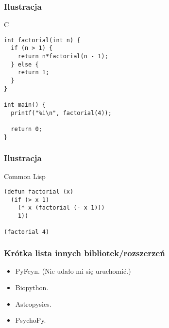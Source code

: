 \documentclass[10pt,t]{beamer}
\begin{document}
\begin{frame}[fragile]
  \frametitle{Ilustracja}


  C \\
\begin{verbatim}
int factorial(int n) {
  if (n > 1) {
    return n*factorial(n - 1);
  } else {
    return 1;
  }
}

int main() {
  printf("%i\n", factorial(4));

  return 0;
}
\end{verbatim}

\end{frame}





\begin{frame}[fragile]
  \frametitle{Ilustracja}


  Common Lisp
\begin{verbatim}
(defun factorial (x)
  (if (> x 1)
    (* x (factorial (- x 1)))
    1))

(factorial 4)
\end{verbatim}

\end{frame}





\begin{frame}
  \frametitle{Krótka lista innych bibliotek/rozszerzeń}


  \begin{itemize}

  \item PyFeyn. (Nie udało mi się uruchomić.)

  \item Biopython.

  \item Astropysics.

  \item PsychoPy.

  \end{itemize}

\end{frame}
\end{document}
